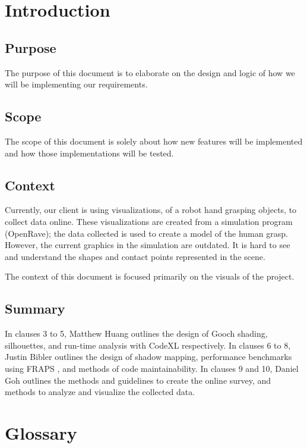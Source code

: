 ﻿\documentclass[10pt,journal,compsoc,draftclsnofoot]{IEEEtran}
\begin{document}
\section{Introduction}
\begin{flushleft}

\subsection{Purpose}
The purpose of this document is to elaborate on the design and logic of how we will be implementing our requirements.

\subsection{Scope}
The scope of this document is solely about how new features will be implemented and how those implementations will be tested.

\subsection{Context}
Currently, our client is using visualizations, of a robot hand grasping objects, to collect data online.
These visualizations are created from a simulation program (OpenRave); the data collected is used to create a model of the human grasp.
However, the current graphics in the simulation are outdated.
It is hard to see and understand the shapes and contact points represented in the scene.

The context of this document is focused primarily on the visuals of the project.

\subsection{Summary}
In clauses 3 to 5, Matthew Huang outlines the design of Gooch shading, silhouettes, and run-time analysis with CodeXL respectively.
In clauses 6 to 8, Justin Bibler outlines the design of shadow mapping, performance benchmarks using FRAPS \cite{fraps}, and methods of code maintainability.
In clauses 9 and 10, Daniel Goh outlines the methods and guidelines to create the online survey, and methods to analyze and visualize the collected data.

\newpage




\section{Glossary}


\end{flushleft}
\end{document}
